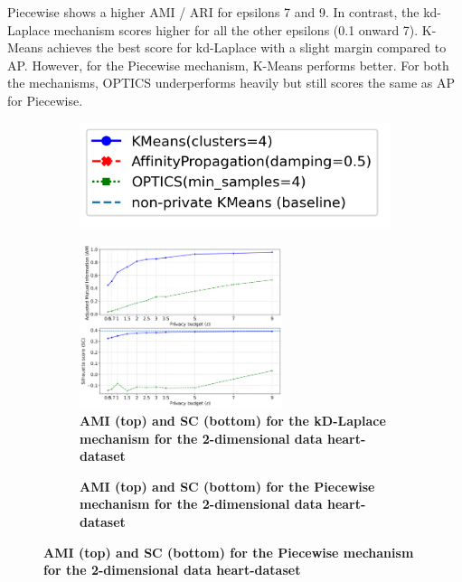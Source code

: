 Piecewise shows a higher AMI / ARI for epsilons 7 and 9. In contrast, the kd-Laplace mechanism scores higher for all the other epsilons (0.1 onward 7).
K-Means achieves the best score for kd-Laplace with a slight margin compared to AP.
However, for the Piecewise mechanism, K-Means performs better.
For both the mechanisms, OPTICS underperforms heavily but still scores the same as AP for Piecewise.
\newpage
\begin{figure}[H]
    \centering
    \begin{subfigure}{0.3\textwidth}
        \includegraphics[width=\textwidth]{Results/2d-laplace/heart-dataset/legend.png}
    \end{subfigure}
    \begin{subfigure}{1\textwidth}
        \caption{\textbf{AMI (top) and SC (bottom) for the kD-Laplace mechanism for the 2-dimensional data heart-dataset}}
        \centering
        \includegraphics[width=0.65\textwidth]{Results/kd-laplace/kd-Laplace/heart-dataset/ami-and-sc_2_dimensions.png}
        \centering
    \end{subfigure}
    \begin{subfigure}{1\textwidth}
        \caption{\textbf{AMI (top) and SC (bottom) for the Piecewise mechanism for the 2-dimensional data heart-dataset}}
        \centering

\end{subfigure}
\end{figure}
